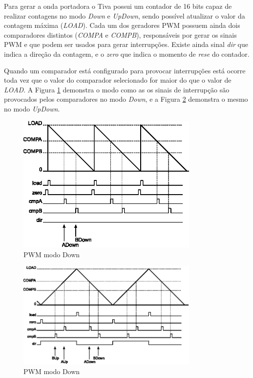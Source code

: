 Para gerar a onda portadora o Tiva possui um contador de 16 bits capaz de realizar contagens no modo \emph{Down} e \emph{UpDown}, sendo possível atualizar o valor da contagem máxima (\emph{LOAD}). Cada um dos geradores PWM possuem ainda dois comparadores distintos (\emph{COMPA} e \emph{COMPB}), responsáveis por gerar os sinais PWM e que podem ser usados para gerar interrupções. Existe ainda sinal \emph{dir} que indica a direção da contagem, e o \emph{zero} que indica o momento de \emph{rese} do contador.

Quando um comparador está configurado para provocar interrupções está ocorre toda vez que o valor do comparador selecionado for maior do que o valor de \emph{LOAD}.  A Figura \ref{fig:PWMCountDownMode} demonstra o modo como as os sinais de interrupção são provocados pelos comparadores no modo \emph{Down}, e a Figura \ref{fig:PWMCountUpDownMode} demonstra o mesmo no modo \emph{UpDown}.

\begin{figure}[H]
	\centering
	\includegraphics[width=0.8\textwidth] {figuras/PWMCountDownMode.eps}
	\caption{PWM modo Down \cite{DATASHEET_TIVA}}
	\label{fig:PWMCountDownMode}
\end{figure}

\begin{figure}[H]
	\centering
	\includegraphics[width=0.8\textwidth] {figuras/PWMCountUpDownMode.eps}
	\caption{PWM modo Down \cite{DATASHEET_TIVA}}
	\label{fig:PWMCountUpDownMode}
\end{figure}


